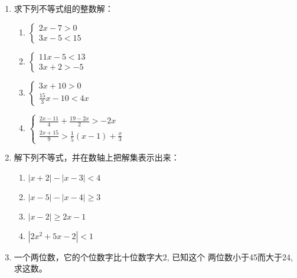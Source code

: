 \begin{enumerate}
\item 求下列不等式组的整数解：
\begin{multicols}{2}
\begin{enumerate}
    \item $\begin{cases}
        2x-7>0\\3x-5<15
    \end{cases}$
    \item $\begin{cases}
        11x-5<13\\3x+2>-5
    \end{cases}$
    \item $\begin{cases}
       3x+10>0\\ \frac{15}{3}x-10<4x
    \end{cases}$
    \item $\begin{cases}
      \frac{2x-11}{4}+\frac{19-2x}{2}>-2x\\
      \frac{2x+15}{9}>\frac{1}{5}(x-1)+\frac{x}{3}
    \end{cases}$
\end{enumerate}
\end{multicols}

\item 解下列不等式，并在数轴上把解集表示出来：
\begin{multicols}{2}
\begin{enumerate}
    \item $|x+2|-|x-3|<4$
    \item $|x-5|-|x-4|\ge 3$
    \item $|x-2|\ge 2x-1$
    \item $|2x^2+5x-2|<1$
\end{enumerate}
\end{multicols}

\item 一个两位数，它的个位数字比十位数字大2, 已知这个
两位数小于45而大于24, 求这数。


\end{enumerate}
